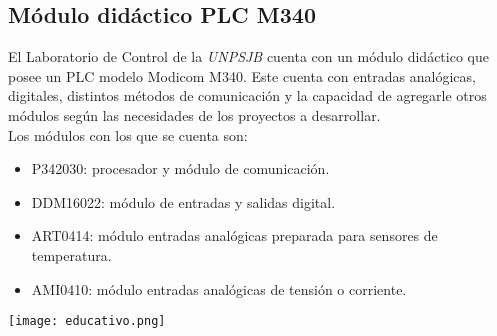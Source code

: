\subsection{Módulo didáctico PLC M340} \label{sec:didac}

El Laboratorio de Control de la \textit{UNPSJB} cuenta con un módulo didáctico que posee un PLC modelo Modicom M340. Este cuenta con entradas analógicas, digitales, distintos métodos de comunicación y la capacidad de agregarle otros módulos según las necesidades de los proyectos a desarrollar.  \\
Los módulos con los que se cuenta son:
\begin{itemize}
	\item P342030: procesador y módulo de comunicación.
	\item DDM16022: módulo de entradas y salidas digital.
	\item ART0414: módulo entradas analógicas preparada para sensores de temperatura.
	\item AMI0410: módulo entradas analógicas de tensión o corriente. 
	
\end{itemize}
\begin{center}
	\texttt{[image: educativo.png]}
	\label{fig:didac}
\end{center}




